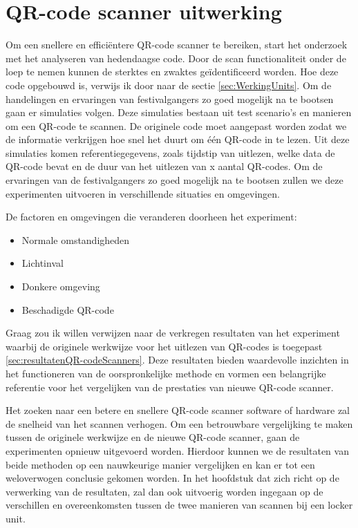 \section{QR-code scanner uitwerking}%
\label{sec:scannerUitwerking}

Om een snellere en efficiëntere QR-code scanner te bereiken, start het onderzoek met het analyseren van hedendaagse code. Door de scan functionaliteit onder de loep te nemen kunnen de sterktes en zwaktes geïdentificeerd worden. Hoe deze code opgebouwd is, verwijs ik door naar de sectie \ref{sec:WerkingUnits}.
Om de handelingen en ervaringen van festivalgangers zo goed mogelijk na te bootsen gaan er simulaties volgen. Deze simulaties bestaan uit test scenario’s en manieren om een QR-code te scannen. De originele code moet aangepast worden zodat we de informatie verkrijgen hoe snel het duurt om één QR-code in te lezen. Uit deze simulaties komen referentiegegevens, zoals tijdstip van uitlezen, welke data de QR-code bevat en de duur van het uitlezen van x aantal QR-codes. Om de ervaringen van de festivalgangers zo goed mogelijk na te bootsen zullen we deze experimenten uitvoeren in verschillende situaties en omgevingen.

De factoren en omgevingen die veranderen doorheen het experiment:

\begin{itemize}
    \item Normale omstandigheden
    \item Lichtinval
    \item Donkere omgeving
    \item Beschadigde QR-code     
\end{itemize}

Graag zou ik willen verwijzen naar de verkregen resultaten van het experiment waarbij de originele werkwijze voor het uitlezen van QR-codes is toegepast \ref{sec:resultatenQR-codeScanners}. Deze resultaten bieden waardevolle inzichten in het functioneren van de oorspronkelijke methode en vormen een belangrijke referentie voor het vergelijken van de prestaties van nieuwe QR-code scanner.

Het zoeken naar een betere en snellere QR-code scanner software of hardware zal de snelheid van het scannen verhogen. Om een betrouwbare vergelijking te maken tussen de originele werkwijze en de nieuwe QR-code scanner, gaan de experimenten opnieuw uitgevoerd worden. Hierdoor kunnen we de resultaten van beide methoden op een nauwkeurige manier vergelijken en kan er tot een weloverwogen conclusie gekomen worden. In het hoofdstuk dat zich richt op de verwerking van de resultaten, zal dan ook uitvoerig worden ingegaan op de verschillen en overeenkomsten tussen de twee manieren van scannen bij een locker unit.
\newpage
